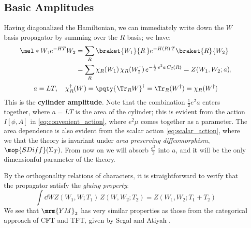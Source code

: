 \documentclass[a4paper
	,10pt
]{article}
\newcommand{\YM}{{\ensuremath{\mrm{YM}_2}}\xspace}
\begin{document}
\subsection{Basic Amplitudes}
	Having diagonalized the Hamiltonian, we can immediately write down the $W$ basis propagator by summing over the $R$ basis; we have:
	\begin{gather}
	\begin{aligned}
		\mel*{W_1}{e^{-HT}}{W_2}
		&= \sum_R
			\braket{W_1}{R\,}
			e^{-H(R)\,T}
			\braket{R}{W_2} \\
		&= \sum_R
			\chi_R(W_1)\,
			\chi_R(W_2^\dagger)\,
			e^{-\frac{1}{2}\,e^2 a\,C_2(R)}
		= Z(W_1,W_2;a),
	\end{aligned}
	\\[.3ex]
		a = LT,
	\quad
		\chi_R^\dagger(W)
		= \pqty{\Tr_R W}^\dagger
		= \Tr_R (W^\dagger)
		= \chi_R(W^\dagger)
	\end{gather}
	This is the \textbf{cylinder amplitude}. 
	Note that the combination
$\frac{1}{2} e^2 a$ enters
together, where $a = LT$ is the area of the cylinder; this is evident from the action $I[\phi,A]$ in \eqref{eq:convenient_action}, where $e^2 \mu$ comes together as a parameter. The area dependence is also evident from the scalar action \eqref{eq:scalar_action}, where we that the theory is invariant under \textit{area preserving diffeomorphism}, $\mop{SDiff}(\Sigma_T)$. From now on we will absorb $\frac{e^2}{2}$ into $a$, and it will be the only dimensionful parameter of the theory.
	
	By the orthogonality relations of characters, it is straightforward to verify that the propagator satisfy the \textit{gluing property}:
	\begin{equation}
		\int \dd{W}
			Z(W_1,W;T_1)\,Z(W,W_2;T_2)
		= Z(W_1,W_2;T_1 + T_2)
	\end{equation}
	We see that \YM has very similar properties as those from the categorical approach of CFT and TFT, given by Segal and Atiyah \cite{Segal1988,Atiyah1988}. 
	
\end{document}
